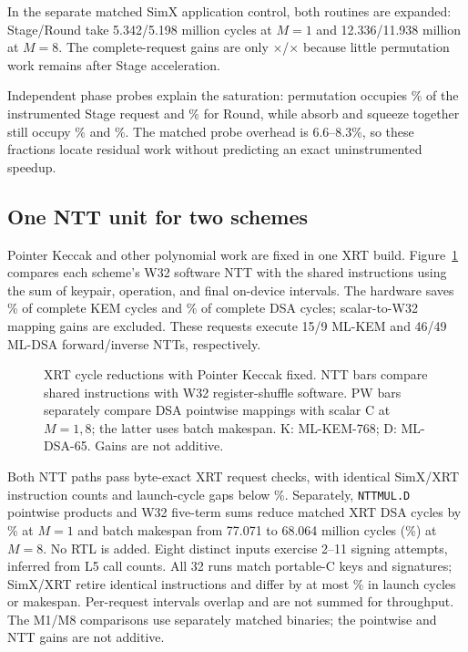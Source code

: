 \documentclass[conference,letterpaper]{IEEEtran}
\begin{document}
In the separate matched SimX application control, both routines are
expanded: Stage/Round take 5.342/5.198 million cycles at $M=1$ and
12.336/11.938 million at $M=8$. The complete-request gains are only
\FusionKemOne{}$\times$/\FusionKemEight{}$\times$ because little permutation
work remains after Stage acceleration.

Independent phase probes explain the saturation: permutation occupies
\StagePermPct{}\% of the instrumented Stage request and \RoundPermPct{}\%
for Round, while absorb and squeeze together still occupy
\StageSpongePct{}\% and \RoundSpongePct{}\%. The matched
probe overhead is 6.6--8.3\%, so these fractions locate residual work
without predicting an exact uninstrumented speedup.

\subsection{One NTT unit for two schemes}
Pointer Keccak and other polynomial work are fixed in one XRT build.
Figure~\ref{fig:sharedntt} compares each scheme's W32 software NTT with
the shared instructions using the sum of keypair, operation, and final
on-device intervals. The hardware saves \KemNttSaved{}\% of complete
KEM cycles and \DsaNttSaved{}\% of complete DSA cycles; scalar-to-W32
mapping gains are excluded. These requests execute 15/9 ML-KEM and
46/49 ML-DSA forward/inverse NTTs, respectively.

\begin{figure}[t]
\centering
\caption{XRT cycle reductions with Pointer Keccak fixed. NTT bars compare
shared instructions with W32 register-shuffle software. PW bars separately
compare DSA pointwise mappings with scalar C at $M=1,8$; the latter uses batch
makespan. K: ML-KEM-768; D: ML-DSA-65. Gains are not additive.}
\label{fig:sharedntt}
\end{figure}

Both NTT paths pass byte-exact XRT request checks, with identical SimX/XRT
instruction counts and launch-cycle gaps below \SharedParityMax{}\%.
Separately, \texttt{NTTMUL.D} pointwise products and W32 five-term sums
reduce matched XRT DSA cycles by \DsaPointwiseXrtSaved{}\% at $M=1$ and
batch makespan from 77.071 to 68.064 million cycles
(\DsaPointwiseEightSaved{}\%) at $M=8$. No RTL is added.
Eight distinct inputs exercise 2--11 signing attempts, inferred from L5
call counts. All 32 runs match portable-C keys and signatures;
SimX/XRT retire identical instructions and differ by at most
\DsaPointwiseEightParity{}\% in launch cycles or makespan. Per-request
intervals overlap and are not summed for throughput. The M1/M8 comparisons
use separately matched binaries; the pointwise and NTT gains are not additive.
\end{document}

